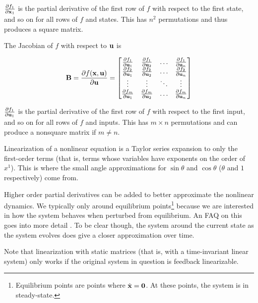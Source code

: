 $\frac{\partial f_1}{\partial \mathbf{x}_1}$ is the partial derivative of the first
row of $f$ with respect to the first state, and so on for all rows of $f$ and
states. This has $n^2$ permutations and thus produces a square matrix.

The Jacobian of $f$ with respect to $\mathbf{u}$ is

\begin{equation*}
  \mathbf{B} = \frac{\partial f(\mathbf{x}, \mathbf{u})}{\partial \mathbf{u}} =
  \begin{bmatrix}
    \frac{\partial f_1}{\partial \mathbf{u}_1} &
      \frac{\partial f_1}{\partial \mathbf{u}_2} & \hdots &
      \frac{\partial f_1}{\partial \mathbf{u}_n} \\
    \frac{\partial f_2}{\partial \mathbf{u}_1} &
      \frac{\partial f_2}{\partial \mathbf{u}_2} & \hdots &
      \frac{\partial f_2}{\partial \mathbf{u}_n} \\
    \vdots & \vdots & \ddots & \vdots \\
    \frac{\partial f_m}{\partial \mathbf{u}_1} &
      \frac{\partial f_m}{\partial \mathbf{u}_2} & \hdots &
      \frac{\partial f_m}{\partial \mathbf{u}_n}
  \end{bmatrix}
\end{equation*}

$\frac{\partial f_1}{\partial \mathbf{u}_1}$ is the partial derivative of the first
row of $f$ with respect to the first input, and so on for all rows of $f$ and
inputs. This has $m \times n$ permutations and can produce a nonsquare matrix if
$m \neq n$.

Linearization of a nonlinear equation is a Taylor series expansion to only the
first-order terms (that is, terms whose variables have exponents on the order of
$x^1$). This is where the small angle approximations for $\sin\theta$ and
$\cos\theta$ ($\theta$ and $1$ respectively) come from.

Higher order partial derivatives can be added to better approximate the
nonlinear dynamics. We typically only  around
equilibrium points\footnote{Equilibrium points are points where
$\dot{\mathbf{x}} = \mathbf{0}$. At these points, the system is in steady-state.}
because we are interested in how the \gls{system} behaves when perturbed from
equilibrium. An FAQ on this goes into more detail
\cite{bib:linearize_equilibrium_point}. To be clear though,
 the \gls{system} around the current
\gls{state} as the \gls{system} evolves does give a closer approximation over
time.

Note that linearization with static matrices (that is, with a time-invariant
linear \gls{system}) only works if the original \gls{system} in question is
feedback linearizable.
